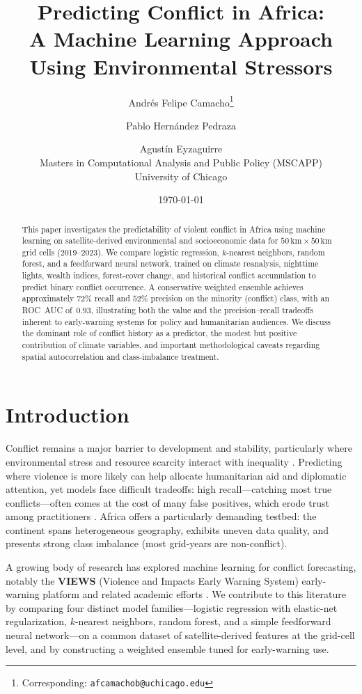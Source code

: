 \documentclass[11pt,a4paper]{article}
\title{\textbf{Predicting Conflict in Africa:\\[0.3em]
\large A Machine Learning Approach Using Environmental Stressors}}
\author{%
  Andrés Felipe Camacho\thanks{Corresponding: \texttt{afcamachob@uchicago.edu}} \and
  Pablo Hernández Pedraza \and
  Agustín Eyzaguirre\\[0.8em]
  \normalsize Masters in Computational Analysis and Public Policy (MSCAPP)\\
  University of Chicago
}
\date{\today}
\begin{document}
\maketitle

\begin{abstract}
\noindent
This paper investigates the predictability of violent conflict in Africa using machine learning on satellite-derived environmental and socioeconomic data for $50\,\mathrm{km}\times 50\,\mathrm{km}$ grid cells (2019--2023). We compare logistic regression, $k$-nearest neighbors, random forest, and a feedforward neural network, trained on climate reanalysis, nighttime lights, wealth indices, forest-cover change, and historical conflict accumulation to predict binary conflict occurrence. A conservative weighted ensemble achieves approximately $72\%$ recall and $52\%$ precision on the minority (conflict) class, with an ROC~AUC of~$0.93$, illustrating both the value and the precision--recall tradeoffs inherent to early-warning systems for policy and humanitarian audiences. We discuss the dominant role of conflict history as a predictor, the modest but positive contribution of climate variables, and important methodological caveats regarding spatial autocorrelation and class-imbalance treatment.
\end{abstract}

\section{Introduction}

Conflict remains a major barrier to development and stability, particularly where environmental stress and resource scarcity interact with inequality \parencite{burke2009warming,hsiang2013quantifying}. Predicting where violence is more likely can help allocate humanitarian aid and diplomatic attention, yet models face difficult tradeoffs: high recall---catching most true conflicts---often comes at the cost of many false positives, which erode trust among practitioners \parencite{mueller2022hard}. Africa offers a particularly demanding testbed: the continent spans heterogeneous geography, exhibits uneven data quality, and presents strong class imbalance (most grid-years are non-conflict).

A growing body of research has explored machine learning for conflict forecasting, notably the \textbf{VIEWS} (Violence and Impacts Early Warning System) early-warning platform \parencite{hegre2024views} and related academic efforts \parencite{ward2010perils,blair2020predicting,cederman2017predicting}. We contribute to this literature by comparing four distinct model families---logistic regression with elastic-net regularization, $k$-nearest neighbors, random forest, and a simple feedforward neural network---on a common dataset of satellite-derived features at the grid-cell level, and by constructing a weighted ensemble tuned for early-warning use.
\end{document}
